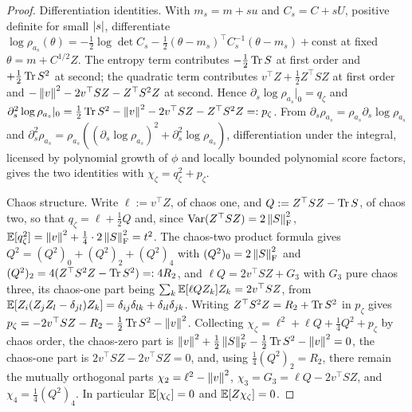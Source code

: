 \begin{proof}
Differentiation identities. With $m_s=m+su$ and $C_s=C+sU$, positive definite for small
$\left\lvert s\right\rvert$, differentiate
$\log\rho_{a_s}(\theta)=-\tfrac12\log\det C_s-\tfrac12(\theta-m_s)^\top C_s^{-1}(\theta-m_s)+\mathrm{const}$
at fixed $\theta=m+C^{1/2}Z$. The entropy term contributes $-\tfrac12\operatorname{Tr} S$ at first order and
$+\tfrac12\operatorname{Tr} S^2$ at second; the quadratic term contributes $v^\top Z+\tfrac12Z^\top SZ$ at
first order and $-\left\lVert v\right\rVert^2-2v^\top SZ-Z^\top S^2Z$ at second. Hence
$\partial_s\log\rho_{a_s}|_0=q_\zeta$ and
$\partial_s^2\log\rho_{a_s}|_0=\tfrac12\operatorname{Tr} S^2-\left\lVert v\right\rVert^2-2v^\top SZ-Z^\top S^2Z=:p_\zeta$. From
$\partial_s\rho_{a_s}=\rho_{a_s}\partial_s\log\rho_{a_s}$ and
$\partial_s^2\rho_{a_s}=\rho_{a_s}((\partial_s\log\rho_{a_s})^2+\partial_s^2\log\rho_{a_s})$,
differentiation under the integral, licensed by polynomial growth of $\phi$ and locally bounded
polynomial score factors, gives the two identities with $\chi_\zeta=q_\zeta^2+p_\zeta$.

Chaos structure. Write $\ell:=v^\top Z$, of chaos one, and $Q:=Z^\top SZ-\operatorname{Tr} S$, of
chaos two, so that $q_\zeta=\ell+\tfrac12Q$ and, since
$\operatorname{Var}(Z^\top SZ)=2\left\lVert S\right\rVert_{\mathrm{F}}^2$,
$\mathbb{E}[q_\zeta^2]=\left\lVert v\right\rVert^2+\tfrac14\cdot2\left\lVert S\right\rVert_{\mathrm{F}}^2=t^2$. The chaos-two product formula
gives $Q^2=(Q^2)_0+(Q^2)_2+(Q^2)_4$ with $(Q^2)_0=2\left\lVert S\right\rVert_{\mathrm{F}}^2$ and
$(Q^2)_2=4(Z^\top S^2Z-\operatorname{Tr} S^2)=:4R_2$, and $\ell Q=2v^\top SZ+G_3$ with $G_3$ pure chaos three,
its chaos-one part being $\sum_k\mathbb{E}[\ell QZ_k]Z_k=2v^\top SZ$, from
$\mathbb{E}[Z_i(Z_jZ_l-\delta_{jl})Z_k]=\delta_{ij}\delta_{lk}+\delta_{il}\delta_{jk}$. Writing
$Z^\top S^2Z=R_2+\operatorname{Tr} S^2$ in $p_\zeta$ gives
$p_\zeta=-2v^\top SZ-R_2-\tfrac12\operatorname{Tr} S^2-\left\lVert v\right\rVert^2$. Collecting
$\chi_\zeta=\ell^2+\ell Q+\tfrac14Q^2+p_\zeta$ by chaos order, the chaos-zero part is
$\left\lVert v\right\rVert^2+\tfrac12\left\lVert S\right\rVert_{\mathrm{F}}^2-\tfrac12\operatorname{Tr} S^2-\left\lVert v\right\rVert^2=0$, the chaos-one part is
$2v^\top SZ-2v^\top SZ=0$, and, using $\tfrac14(Q^2)_2=R_2$, there remain the mutually
orthogonal parts $\chi_2=\ell^2-\left\lVert v\right\rVert^2$, $\chi_3=G_3=\ell Q-2v^\top SZ$, and
$\chi_4=\tfrac14(Q^2)_4$. In particular $\mathbb{E}[\chi_\zeta]=0$ and $\mathbb{E}[Z\chi_\zeta]=0$.


\end{proof}
